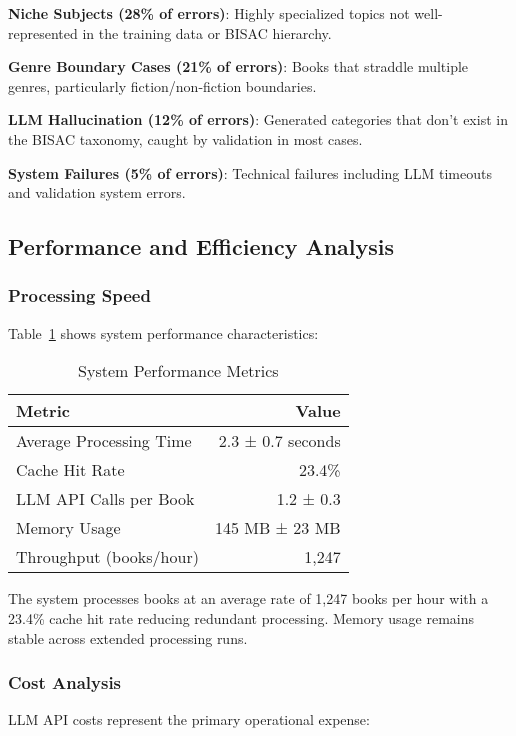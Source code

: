 \documentclass{article}
\begin{document}
\textbf{Niche Subjects (28\% of errors)}: Highly specialized topics not well-represented in the training data or BISAC hierarchy.

\textbf{Genre Boundary Cases (21\% of errors)}: Books that straddle multiple genres, particularly fiction/non-fiction boundaries.

\textbf{LLM Hallucination (12\% of errors)}: Generated categories that don't exist in the BISAC taxonomy, caught by validation in most cases.

\textbf{System Failures (5\% of errors)}: Technical failures including LLM timeouts and validation system errors.

\subsection{Performance and Efficiency Analysis}

\subsubsection{Processing Speed}

Table~\ref{tab:performance_metrics} shows system performance characteristics:

\begin{table}[ht]
\centering
\caption{System Performance Metrics}
\label{tab:performance_metrics}
\begin{tabular}{@{}lr@{}}
\toprule
Metric & Value \\
\midrule
Average Processing Time & 2.3 ± 0.7 seconds \\
Cache Hit Rate & 23.4\% \\
LLM API Calls per Book & 1.2 ± 0.3 \\
Memory Usage & 145 MB ± 23 MB \\
Throughput (books/hour) & 1,247 \\
\bottomrule
\end{tabular}
\end{table}

The system processes books at an average rate of 1,247 books per hour with a 23.4\% cache hit rate reducing redundant processing. Memory usage remains stable across extended processing runs.

\subsubsection{Cost Analysis}

LLM API costs represent the primary operational expense:
\end{document}
